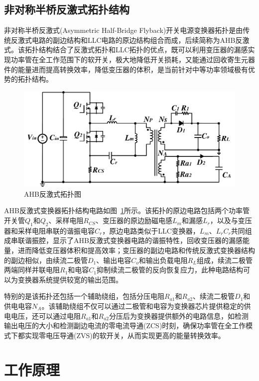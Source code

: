 \subsection{非对称半桥反激式拓扑结构}

非对称半桥反激式(Asymmetric Half-Bridge Flyback)开关电源变换器拓扑是由传统反激式电路的副边结构和LLC电路的原边结构组合而成，后续简称为AHB反激式。该拓扑结构结合了反激式拓扑和LLC拓扑的优点，既可以利用变压器的漏感实现功率管在全工作范围下的软开关，极大地降低开关损耗，又能通过回收寄生元器件的能量进而提高转换效率，降低变压器的体积，是当前针对中等功率领域极有优势的拓扑结构。

\begin{figure}[htbp] 
    \centering
    \includegraphics[width=0.8\linewidth]{figures/AHB拓扑图.pdf}
    \caption{AHB反激式拓扑图}
    \label{fig:AHB拓扑图}
\end{figure}

AHB反激式变换器拓扑结构电路如图~\ref{fig:AHB拓扑图}所示。该拓扑的原边电路包括两个功率管开关管$Q_1$和$Q_2$、采样电阻$R_{CS}$、变压器的原边励磁电感$L_m$和漏感$L_r$，以及与变压器和采样电阻串联的谐振电容$C_r$，原边电路类似于LLC变换器，$L_m$、$L_r$$C_r$共同组成串联谐振腔，显示了AHB反激式变换器电路的谐振特性，回收变压器的漏感能量，进而降低变压器体积和提高效率；变压器的副边电路和传统反激式变换器结构的副边相似，由续流二极管$D_1$、输出电容$C_o$和输出负载电阻$R_L$组成，续流二极管两端同样并联电阻$R_1$和电容$C_1$抑制续流二极管的反向恢复应力，此种电路结构可以为变换器系统提供较宽的输出范围。

特别的是该拓扑还包括一个辅助绕组，包括分压电阻$R_{a1}$和$R_{a2}$、续流二极管$D_1$和供电电容$N_A$。该辅助绕组不仅可以通过二极管和电容为变换器芯片提供稳定的供电电压，还可以通过电阻$R_{a1}$和$R_{a2}$分压后为变换器提供额外的电路信息，如检测输出电压的大小和检测副边电流的零电流导通(ZCS)时刻，确保功率管在全工作模式下都实现零电压导通(ZVS)的软开关，从而实现更高的能量转换效率。




\section{工作原理}


